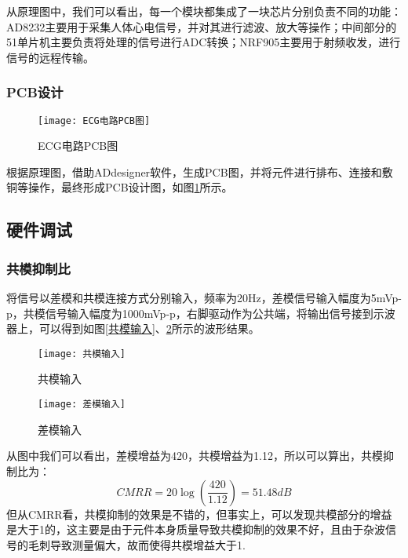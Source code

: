 \documentclass{zjureport}
\begin{document}
	从原理图中，我们可以看出，每一个模块都集成了一块芯片分别负责不同的功能：AD8232主要用于采集人体心电信号，并对其进行滤波、放大等操作；中间部分的51单片机主要负责将处理的信号进行ADC转换；NRF905主要用于射频收发，进行信号的远程传输。
	
	\subsubsection{PCB设计}
	
	\begin{figure}[H]
		\centering%
		\texttt{[image: ECG电路PCB图]}
		\caption{ECG电路PCB图}%
		\label{ECG电路PCB图}%
	\end{figure}

	根据原理图，借助ADdesigner软件，生成PCB图，并将元件进行排布、连接和敷铜等操作，最终形成PCB设计图，如图\ref{ECG电路PCB图}所示。
	
	\subsection{硬件调试}
	
	\subsubsection{共模抑制比}
	
	将信号以差模和共模连接方式分别输入，频率为20Hz，差模信号输入幅度为5mVp-p，共模信号输入幅度为1000mVp-p，右脚驱动作为公共端，将输出信号接到示波器上，可以得到如图\ref{共模输入}、\ref{差模输入}所示的波形结果。
	
	\begin{figure}[H]
		\centering
		\begin{minipage}[t]{0.49\linewidth}%
			\texttt{[image: 共模输入]}%
			\caption{共模输入}
			\label{共模输入}
		\end{minipage}%
		\begin{minipage}[t]{0.49\linewidth}
			\texttt{[image: 差模输入]}
			\caption{差模输入}
			\label{差模输入}
		\end{minipage}
	\end{figure}

	从图中我们可以看出，差模增益为420，共模增益为1.12，所以可以算出，共模抑制比为：
	\begin{equation}
		CMRR=20\log(\frac{420}{1.12})=51.48dB
	\end{equation}
	但从CMRR看，共模抑制的效果是不错的，但事实上，可以发现共模部分的增益是大于1的，这主要是由于元件本身质量导致共模抑制的效果不好，且由于杂波信号的毛刺导致测量偏大，故而使得共模增益大于1.
	
\end{document}
